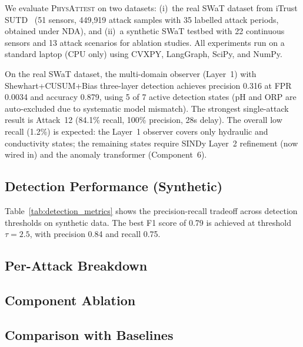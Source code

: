 \documentclass[journal]{IEEEtran}
\newcommand{\physattest}{\textsc{PhysAttest}}
\begin{document}
We evaluate \physattest{} on two datasets: (i)~the real SWaT dataset from iTrust SUTD~\cite{goh2017dataset} (51 sensors, 449{,}919 attack samples with 35 labelled attack periods, obtained under NDA), and (ii)~a synthetic SWaT testbed with 22 continuous sensors and 13 attack scenarios for ablation studies. All experiments run on a standard laptop (CPU only) using CVXPY, LangGraph, SciPy, and NumPy.

On the real SWaT dataset, the multi-domain observer (Layer~1) with Shewhart+CUSUM+Bias three-layer detection achieves precision 0.316 at FPR 0.0034 and accuracy 0.879, using 5 of 7 active detection states (pH and ORP are auto-excluded due to systematic model mismatch). The strongest single-attack result is Attack~12 (84.1\% recall, 100\% precision, 28s delay). The overall low recall (1.2\%) is expected: the Layer~1 observer covers only hydraulic and conductivity states; the remaining states require SINDy Layer~2 refinement (now wired in) and the anomaly transformer (Component~6).

\subsection{Detection Performance (Synthetic)}

Table~\ref{tab:detection_metrics} shows the precision-recall tradeoff across detection thresholds on synthetic data. The best F1 score of 0.79 is achieved at threshold $\tau = 2.5$, with precision 0.84 and recall 0.75.



\subsection{Per-Attack Breakdown}



\subsection{Component Ablation}



\subsection{Comparison with Baselines}
\end{document}
